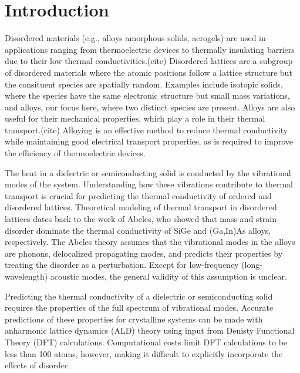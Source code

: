 \documentclass[aps,prb,onecolumn,preprint,superscriptaddress,amsmath,amssymb,floatfix]{revtex4}
\begin{document}
\section{\label{S:Introduction}Introduction}

Disordered materials (e.g., alloys amorphous solids, aerogels) 
are used in 
applications ranging from thermoelectric devices to 
thermally insulating  
barriers due to their low thermal conductivities.(cite) 
Disordered lattices are a subgroup of disordered materials where 
the atomic positions follow a lattice structure but the 
consituent species are spatially random. Examples include isotopic 
solids, where the species have the same electronic structure but 
small mass variations,\cite{tamura_isotope_1983} 
and alloys, our focus here, where two distinct 
species are present. Alloys are also useful for their mechanical 
properties, which play a role in their thermal transport.(cite) 
Alloying is an effective method 
to reduce thermal conductivity 
while maintaining good electrical transport properties, as is required to 
improve the 
efficiency of thermoelectric devices.
\cite{koh_lattice_2009,qiu_molecular_2012,tian_phonon_2012} 

The heat in a dielectric or semiconducting solid is conducted 
by the vibrational modes of the system. 
Understanding how these vibrations contribute to thermal transport 
is crucial for predicting the 
thermal conductivity of ordered and disordered lattices.
Theoretical modeling of thermal transport in disordered 
lattices dates back to 
the work of Abeles, who showed that mass and strain 
disorder dominate the thermal conductivity of SiGe and 
(Ga,In)As alloys, respectively.\cite{abeles_lattice_1963} The Abeles 
theory assumes that the vibrational modes in the alloys are phonons, 
delocalized propagating modes, and predicts their properties by treating 
the disorder as a perturbation.
Except for low-frequency (long-wavelength) acoustic modes,
the general validity of this assumption is unclear. 

Predicting the thermal conductivity of a dielectric or 
semiconducting solid requires the properties of the full spectrum 
of vibrational modes.
\cite{ziman_electrons_2001,feldman_thermal_1993,allen_diffusons_1999} 
Accurate predictions of these properties for crystalline systems 
can be made with anharmonic lattice dynamics (ALD) theory 
using input from Denisty Functional Theory (DFT)  
calculations.\cite{ward_intrinsic_2010,lindsay_thermal_2012,
garg_role_2011,
shiga_microscopic_2012,tian_phonon_2012,
shiomi_thermal_2011,esfarjani_heat_2011}
Computational costs limit DFT calculations to be less than 100 atoms, 
however, 
making it difficult to explicitly incorporate the effects of disorder.
\cite{koker_thermal_2009,bao_first-principles_2012,
lindsay_thermal_2012,tian_phonon_2012,garg_role_2011}
\end{document}
